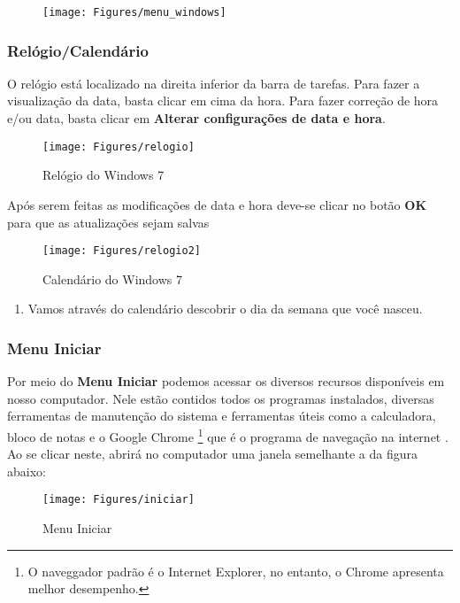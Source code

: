 \documentclass[hidelinks,12pt]{article}
\begin{document}
\begin{figure}[!h]
	\centering
	\texttt{[image: Figures/menu\_windows]}
	\label{fig:menu_windows}
\end{figure}

\subsubsection{Relógio/Calendário}

O relógio está localizado na direita inferior da barra de tarefas. Para fazer a visualização da data, basta clicar em cima da hora. Para fazer correção de hora e/ou data, basta clicar em {\bf Alterar configurações de data e hora}.

\begin{figure}[!h]
	\centering
	\texttt{[image: Figures/relogio]}
	\caption{Relógio do Windows 7}
	\label{fig:relogio}
\end{figure}

Após serem feitas as modificações de data e hora deve-se clicar no botão {\bf OK} para que as atualizações sejam salvas

\begin{figure}[!h]
	\centering
	\texttt{[image: Figures/relogio2]}
	\caption{Calendário do Windows 7}
	\label{fig:calendario}
\end{figure}

\begin{enumerate}
	\item Vamos através do calendário descobrir o dia da semana que você nasceu.
\end{enumerate}


\subsubsection{Menu Iniciar}

Por meio do \textbf{Menu Iniciar} podemos acessar os diversos recursos disponíveis em nosso computador. Nele estão contidos todos os programas instalados, diversas ferramentas de manutenção do sistema e ferramentas úteis como a calculadora, bloco de notas e o Google Chrome \footnote{O naveggador padrão é o Internet Explorer, no entanto, o Chrome apresenta melhor desempenho.} que é o programa de navegação na internet . Ao se clicar neste, abrirá no computador uma janela semelhante a da figura abaixo:

\begin{figure}[!h]
	\centering
	\texttt{[image: Figures/iniciar]}
	\caption{Menu Iniciar}
	\label{fig:iniciar}
\end{figure}
\end{document}
